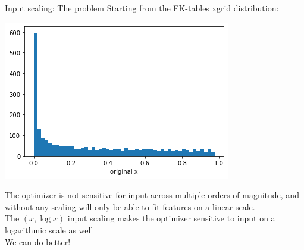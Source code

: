 \documentclass[aspectratio=169,11pt]{beamer}
\newcommand{\nn}{\vspace*{1em}}
\begin{document}
\begin{frame}[t]{Input scaling: The problem}
  Starting from the FK-tables xgrid distribution:\\
  \begin{center}
    \includegraphics[height=0.4\textheight]{figures/default_xgrid.png}
  \end{center}
  The optimizer is not sensitive for input across multiple orders of magnitude, and without any scaling will only be able to fit features on a linear scale. \\ \nn
  The $(x,\log x)$ input scaling makes the optimizer sensitive to input on a logarithmic scale as well \\ \nn
  We can do better!
\end{frame}
\end{document}
